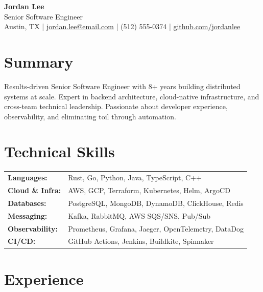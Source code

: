 \documentclass[11pt,a4paper]{article}
\begin{document}
\begin{center}
  {\LARGE \textbf{Jordan Lee}}\\[3pt]
  {\large \textcolor{accent}{Senior Software Engineer}}\\[4pt]
  Austin, TX \quad|\quad
  \href{mailto:jordan.lee@email.com}{jordan.lee@email.com} \quad|\quad
  (512) 555-0374 \quad|\quad
  \href{https://github.com/jordanlee}{github.com/jordanlee}
\end{center}

\section{Summary}
Results-driven Senior Software Engineer with 8+ years building distributed systems at scale. Expert in backend architecture, cloud-native infrastructure, and cross-team technical leadership. Passionate about developer experience, observability, and eliminating toil through automation.

\section{Technical Skills}
\begin{tabular}{@{}ll}
\textbf{Languages:}        & Rust, Go, Python, Java, TypeScript, C++ \\
\textbf{Cloud \& Infra:}   & AWS, GCP, Terraform, Kubernetes, Helm, ArgoCD \\
\textbf{Databases:}        & PostgreSQL, MongoDB, DynamoDB, ClickHouse, Redis \\
\textbf{Messaging:}        & Kafka, RabbitMQ, AWS SQS/SNS, Pub/Sub \\
\textbf{Observability:}    & Prometheus, Grafana, Jaeger, OpenTelemetry, DataDog \\
\textbf{CI/CD:}            & GitHub Actions, Jenkins, Buildkite, Spinnaker \\
\end{tabular}

\section{Experience}
\end{document}
